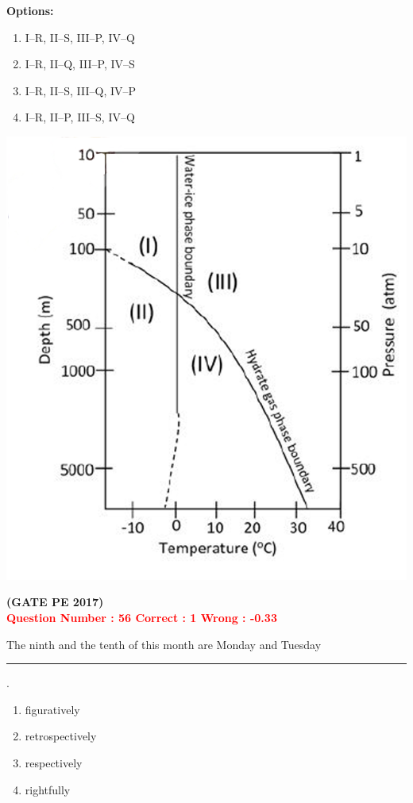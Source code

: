 \documentclass[12pt]{article}
\begin{document}
{\begin{minipage}{0.58\textwidth}
\textbf{Options:}
\begin{enumerate}[label=(\Alph*)]
  \item I–R, II–S, III–P, IV–Q  
  \item I–R, II–Q, III–P, IV–S  
  \item I–R, II–S, III–Q, IV–P  
  \item I–R, II–P, III–S, IV–Q  
\end{enumerate}
\end{minipage}
\hfill
\begin{minipage}{0.4\textwidth}
\begin{flushright}
\includegraphics[width=\linewidth]{Figs/Graph_Q55.png} 

\end{flushright}
\end{minipage}

\hfill\textbf{(GATE PE 2017)}\\[0.6cm]

\textcolor{red}{\textbf{Question Number : 56 \hfill Correct : 1  Wrong : -0.33}}


The ninth and the tenth of this month are Monday and Tuesday \rule{2cm}{0.4pt}.

\begin{enumerate}[label=(\Alph*)]
    \item figuratively
    \item retrospectively
    \item respectively
    \item rightfully
\end{enumerate}

}
\end{document}
